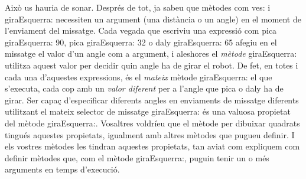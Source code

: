 Això us hauria de sonar. Després de tot, ja sabeu que mètodes com \textsf{ves:} i \textsf{giraEsquerra:} necessiten un argument (una distància o un angle) en el moment de l'enviament del missatge. Cada vegada que escriviu una expressió com \textsf{pica giraEsquerra: 90}, \textsf{pica giraEsquerra: 32} o \textsf{daly giraEsquerra: 65} afegiu en el missatge el valor d'un angle com a argument, i aleshores el \emph{mètode} \textsf{giraEsquerra:} utilitza aquest valor per decidir quin angle ha de girar el robot. De fet, en totes i cada una d'aquestes expressions, és el \emph{mateix} mètode \textsf{giraEsquerra:} el que s'executa, cada cop amb un \emph{valor diferent} per a l'angle que \textsf{pica} o \textsf{daly} ha de girar. Ser capaç d'especificar diferents angles en enviaments de missatge diferents utilitzant el mateix selector de missatge \textsf{giraEsquerra:} és una valuosa propietat  del mètode \textsf{giraEsquerra:}. Vosaltres voldríeu que el mètode per dibuixar quadrats tingués aquestes propietats, igualment amb altres mètodes que pugueu definir. I els vostres mètodes les tindran aquestes propietats, tan aviat com expliquem com definir mètodes que, com el mètode \textsf{giraEsquerra:}, puguin tenir un o més arguments en temps d'execució.

